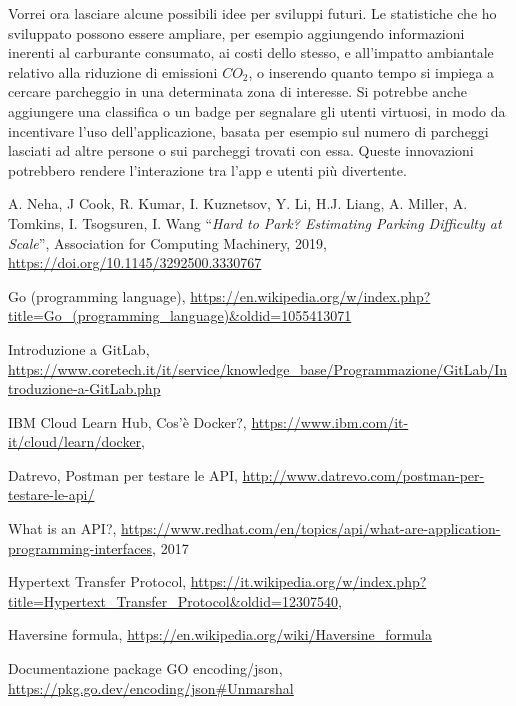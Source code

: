 \documentclass[italian, Lau, oneside, nodefaultfont, noexaminfo]{sapthesis}
\begin{document}
Vorrei ora lasciare alcune possibili idee per sviluppi futuri. 
Le statistiche che ho sviluppato possono essere ampliare, per esempio aggiungendo informazioni inerenti al carburante consumato, ai costi dello stesso,  e all'impatto ambiantale relativo alla riduzione di emissioni $CO_2$, o inserendo quanto tempo si impiega a cercare parcheggio in una determinata zona di interesse. Si potrebbe anche aggiungere una   classifica o  un badge per segnalare gli utenti virtuosi, in modo da incentivare l'uso dell'applicazione, basata per esempio sul numero di parcheggi lasciati ad altre persone o sui parcheggi trovati con essa. Queste innovazioni potrebbero rendere l'interazione  tra l'app e  utenti più divertente.







\backmatter
{}
\begin{thebibliography}{17}

A. Neha, J Cook, R. Kumar, I. Kuznetsov, Y. Li, H.J. Liang, A. Miller, A. Tomkins, I. Tsogsuren, I.  Wang ``\textit{Hard to Park? Estimating Parking Difficulty at Scale}'', Association for Computing Machinery, 2019, \url{https://doi.org/10.1145/3292500.3330767}


Go (programming language), \url{ https://en.wikipedia.org/w/index.php?title=Go_(programming_language)&oldid=1055413071}

Introduzione a GitLab, \url{https://www.coretech.it/it/service/knowledge_base/Programmazione/GitLab/Introduzione-a-GitLab.php}


IBM Cloud Learn Hub, Cos'è Docker?, \url{https://www.ibm.com/it-it/cloud/learn/docker},

Datrevo, Postman per testare le API,  \url{http://www.datrevo.com/postman-per-testare-le-api/}

What is an API?, \url{https://www.redhat.com/en/topics/api/what-are-application-programming-interfaces}, 2017

Hypertext Transfer Protocol, \url{https://it.wikipedia.org/w/index.php?title=Hypertext_Transfer_Protocol&oldid=12307540},


Haversine formula, \url{https://en.wikipedia.org/wiki/Haversine_formula}

 

Documentazione package GO encoding/json, \url{ https://pkg.go.dev/encoding/json#Unmarshal}
 


\end{thebibliography}
\end{document}
